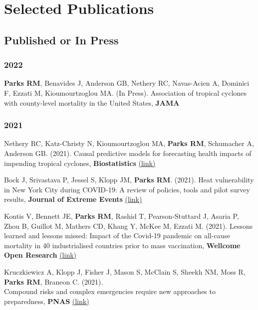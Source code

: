 \section*{Selected Publications}

\subsection*{Published or In Press}

\subsubsection*{2022}

\noindent \textbf{Parks RM}, Benavides J, Anderson GB, Nethery RC, Navas-Acien A, Dominici F, Ezzati M, Kioumourtzoglou MA. (In Press). Association of tropical cyclones with county-level mortality in the United States, \textbf{JAMA}

\subsubsection*{2021}

\noindent Nethery RC, Katz-Christy N, Kioumourtzoglou MA, \textbf{Parks RM}, Schumacher A, Anderson GB. (2021). Causal predictive models for forecasting health impacts of impending tropical cyclones, \textbf{Biostatistics} \href{https://academic.oup.com/biostatistics/advance-article/doi/10.1093/biostatistics/kxab047/6485226?guestAccessKey=378fb8f6-102d-4b21-a93d-b0a01353c19f#}{(link)} \medskip

\noindent Bock J, Srivastava P, Jessel S, Klopp JM, \textbf{Parks RM}. (2021). Heat vulnerability in New York City during COVID-19: A review of policies, tools and pilot survey results, \textbf{Journal of Extreme Events} \href{https://www.worldscientific.com/doi/10.1142/S2345737621500159}{(link)} \medskip

\noindent Kontis V, Bennett JE, \textbf{Parks RM}, Rashid T, Pearson-Stuttard J, Asaria P, Zhou B, Guillot M, Mathers CD, Khang Y, McKee M, Ezzati M. (2021). Lessons learned and lessons missed: Impact of the Covid-19 pandemic on all-cause mortality in 40 industrialised countries prior to mass vaccination, \textbf{Wellcome Open Research} \href{https://wellcomeopenresearch.org/articles/6-279/v1}{(link)} \medskip

\noindent Kruczkiewicz A, Klopp J, Fisher J, Mason S, McClain S, Sheekh NM, Moss R, \textbf{Parks RM}, Braneon C. (2021).\\Compound risks and complex emergencies require new approaches to preparedness, \textbf{PNAS} \href{https://www.pnas.org/content/118/19/e2106795118}{(link)} \medskip

